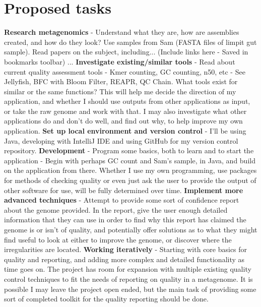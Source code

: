\documentclass[11pt,fleqn,twoside]{article}
\begin{document}
\section{Proposed tasks}
\textbf{Research metagenomics} - Understand what they are, how are assemblies created, and how do they look? Use samples from Sam (FASTA files of limpit gut sample). Read papers on the subject, including... (Include links here - Saved in bookmarks toolbar) ...
\newline
\noindent
\textbf{Investigate existing/similar tools} - Read about current quality assessment tools - Kmer counting, GC counting, n50, etc - See Jellyfish, BFC with Bloom Filter, REAPR, QC Chain. What tools exist for similar or the same functions? This will help me decide the direction of my application, and whether I should use outputs from other applications as input, or take the raw genome and work with that. I may also investigate what other applications do and don't do well, and find out why, to help improve my own application.
\newline
\noindent
\textbf{Set up local environment and version control} - I'll be using Java, developing with IntelliJ IDE and using GitHub for my version control repository.
\newline
\noindent
\textbf{Development} - Program some basics, both to learn and to start the application - Begin with perhaps GC count and Sam's sample, in Java, and build on the application from there. Whether I use my own programming, use packages for methods of checking quality or even just ask the user to provide the output of other software for use, will be fully determined over time.
\newline
\noindent
\textbf{Implement more advanced techniques} - Attempt to provide some sort of confidence report about the genome provided. In the report, give the user enough detailed information that they can use in order to find why this report has claimed the genome is or isn't of quality, and potentially offer solutions as to what they might find useful to look at either to improve the genome, or discover where the irregularities are located.
\newline
\noindent
\textbf{Working iteratively} -  Starting with core basics for quality and reporting, and adding more complex and detailed functionality as time goes on. The project has room for expansion with multiple existing quality control techniques to fit the needs of reporting on quality in a metagenome. It is possible I may leave the project open ended, but the main task of providing some sort of completed toolkit for the quality reporting should be done.
\end{document}
